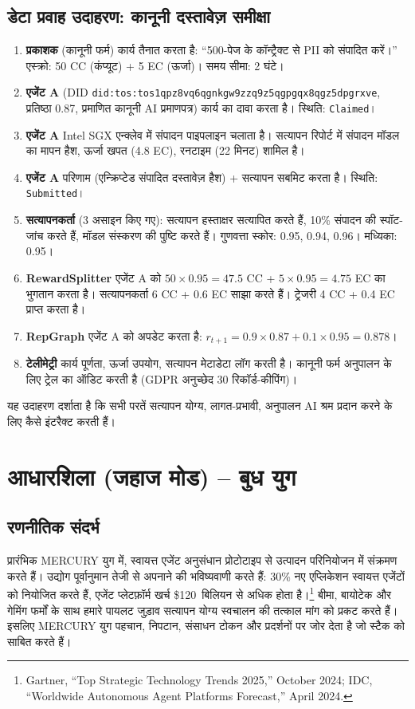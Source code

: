\documentclass[11pt]{article}
\begin{document}
\subsection{डेटा प्रवाह उदाहरण: कानूनी दस्तावेज़ समीक्षा}
\begin{enumerate}[label=\arabic*.]
  \item \textbf{प्रकाशक} (कानूनी फर्म) कार्य तैनात करता है: ``500-पेज के कॉन्ट्रैक्ट से PII को संपादित करें।'' एस्क्रो: 50 CC (कंप्यूट) + 5 EC (ऊर्जा)। समय सीमा: 2 घंटे।
  \item \textbf{एजेंट A} (DID \texttt{did:tos:tos1qpz8vq6qgnkgw9zzq9z5qgpgqx8qgz5dpgrxve}, प्रतिष्ठा 0.87, प्रमाणित कानूनी AI प्रमाणपत्र) कार्य का दावा करता है। स्थिति: \texttt{Claimed}।
  \item \textbf{एजेंट A} Intel SGX एन्क्लेव में संपादन पाइपलाइन चलाता है। सत्यापन रिपोर्ट में संपादन मॉडल का मापन हैश, ऊर्जा खपत (4.8 EC), रनटाइम (22 मिनट) शामिल है।
  \item \textbf{एजेंट A} परिणाम (एन्क्रिप्टेड संपादित दस्तावेज़ हैश) + सत्यापन सबमिट करता है। स्थिति: \texttt{Submitted}।
  \item \textbf{सत्यापनकर्ता} (3 असाइन किए गए): सत्यापन हस्ताक्षर सत्यापित करते हैं, 10\% संपादन की स्पॉट-जांच करते हैं, मॉडल संस्करण की पुष्टि करते हैं। गुणवत्ता स्कोर: 0.95, 0.94, 0.96। मध्यिका: 0.95।
  \item \textbf{RewardSplitter} एजेंट A को $50 \times 0.95 = 47.5$ CC + $5 \times 0.95 = 4.75$ EC का भुगतान करता है। सत्यापनकर्ता 6 CC + 0.6 EC साझा करते हैं। ट्रेजरी 4 CC + 0.4 EC प्राप्त करता है।
  \item \textbf{RepGraph} एजेंट A को अपडेट करता है: $r_{t+1} = 0.9 \times 0.87 + 0.1 \times 0.95 = 0.878$।
  \item \textbf{टेलीमेट्री} कार्य पूर्णता, ऊर्जा उपयोग, सत्यापन मेटाडेटा लॉग करती है। कानूनी फर्म अनुपालन के लिए ट्रेल का ऑडिट करती है (GDPR अनुच्छेद 30 रिकॉर्ड-कीपिंग)।
\end{enumerate}

यह उदाहरण दर्शाता है कि सभी परतें सत्यापन योग्य, लागत-प्रभावी, अनुपालन AI श्रम प्रदान करने के लिए कैसे इंटरैक्ट करती हैं।

\section{आधारशिला (जहाज मोड) -- बुध युग}
\subsection{रणनीतिक संदर्भ}
प्रारंभिक MERCURY युग में, स्वायत्त एजेंट अनुसंधान प्रोटोटाइप से उत्पादन परिनियोजन में संक्रमण करते हैं। उद्योग पूर्वानुमान तेजी से अपनाने की भविष्यवाणी करते हैं: 30\% नए एप्लिकेशन स्वायत्त एजेंटों को नियोजित करते हैं, एजेंट प्लेटफ़ॉर्म खर्च \$120~बिलियन से अधिक होता है।\footnote{Gartner, ``Top Strategic Technology Trends 2025,'' October 2024; IDC, ``Worldwide Autonomous Agent Platforms Forecast,'' April 2024.} बीमा, बायोटेक और गेमिंग फर्मों के साथ हमारे पायलट जुड़ाव सत्यापन योग्य स्वचालन की तत्काल मांग को प्रकट करते हैं। इसलिए MERCURY युग पहचान, निपटान, संसाधन टोकन और प्रदर्शनों पर जोर देता है जो स्टैक को साबित करते हैं।
\end{document}
